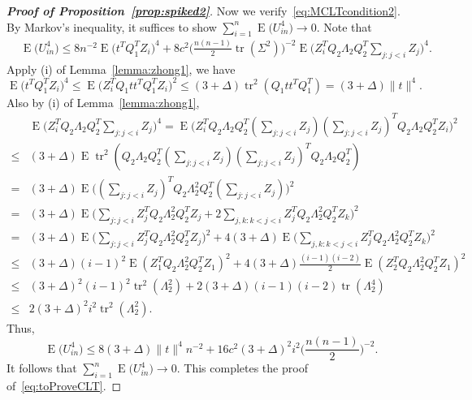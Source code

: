 \documentclass[3p]{elsarticle}
\DeclareMathOperator{\mytr}{tr}
\DeclareMathOperator{\myE}{E}
\theoremstyle{plain}
\theoremstyle{definition}
\theoremstyle{remark}
\begin{document}
\begin{proof}[\textbf{Proof of Proposition~\ref{prop:spiked2}}]
     Now we verify~\eqref{eq:MCLTcondition2}.
     By Markov's inequality, it suffices to show $\sum_{i=1}^n \myE\big(U_{in}^4\big)\to 0$.
     Note that
     $$
     \begin{aligned}
         &\myE\big(U_{in}^4\big)
         \leq
         8n^{-2}\myE \big(t^T Q_1^T Z_i\big)^4+
         8c^2  
         \big(\frac{n(n-1)}{2} \mytr(\Sigma^2)\big)^{-2}
         \myE\big( Z_i^T Q_2 \Lambda_2 Q_2^T \sum_{j:j<i}Z_j\big)^4.
     \end{aligned}
     $$
    Apply (i) of Lemma~\ref{lemma:zhong1}, we have
    $$
\myE \big(t^T Q_1^T Z_i\big)^4\leq
         \myE \big( Z_i^T Q_1 t t^T Q_1^T Z_i\big)^2
         \leq (3+\Delta)\mytr^2 (Q_1 t t^T Q_1^T)
         = (3+\Delta) \|t\|^4.
    $$
    Also by (i) of Lemma~\ref{lemma:zhong1},
    $$
    \begin{aligned}
        &
         \myE\big( Z_i^T Q_2 \Lambda_2 Q_2^T \sum_{j:j<i}Z_j\big)^4
         =
        \myE\big( Z_i^T Q_2 \Lambda_2 Q_2^T (\sum_{j:j<i}Z_j)(\sum_{j:j<i}Z_j)^T Q_2 \Lambda_2 Q_2^T Z_i\big)^2
        \\
        \leq &
        (3+\Delta)\myE \mytr^2 (Q_2 \Lambda_2 Q_2^T (\sum_{j:j<i}Z_j)(\sum_{j:j<i}Z_j)^T Q_2 \Lambda_2 Q_2^T)
        \\
        = &
        (3+\Delta)\myE  \Big((\sum_{j:j<i}Z_j)^T Q_2 \Lambda_2^2 Q_2^T (\sum_{j:j<i}Z_j)\Big)^2
        \\
        = &
        (3+\Delta)\myE  \Big(\sum_{j:j<i}Z_j^T Q_2 \Lambda_2^2 Q_2^T Z_j+2\sum_{j,k:k<j<i}Z_j^T Q_2 \Lambda_2^2 Q_2^T Z_k\Big)^2
        \\
        = &
        (3+\Delta)\myE  \Big(\sum_{j:j<i}Z_j^T Q_2 \Lambda_2^2 Q_2^T Z_j \Big)^2+4(3+\Delta)\myE \Big(\sum_{j,k:k<j<i}Z_j^T Q_2 \Lambda_2^2 Q_2^T Z_k\Big)^2
        \\
        \leq &
        (3+\Delta) (i-1)^2 \myE (Z_1^T Q_2 \Lambda_2^2 Q_2^T Z_1)^2 +4(3+\Delta)\frac{(i-1)(i-2)}{2} \myE (Z_2^T Q_2 \Lambda_2^2 Q_2^T Z_1)^2
        \\
        \leq &
        (3+\Delta)^2 (i-1)^2 \mytr^2 (\Lambda_2^2)  +2(3+\Delta)(i-1)(i-2)\mytr(\Lambda_2^4)
        \\
        \leq &
        2(3+\Delta)^2 i^2 \mytr^2 (\Lambda_2^2).
    \end{aligned}
    $$
    Thus,
     $$
         \myE\big(U_{in}^4\big)
         \leq 8 (3+\Delta)\|t\|^4 n^{-2}+
         16 c^2 (3+\Delta)^2 i^2 \big(\frac{n(n-1)}{2}\big)^{-2}.
     $$
     It follows that
     $
         \sum_{i=1}^n \myE\big(U_{in}^4\big)
        \to 0.
     $
     This completes the proof of~\eqref{eq:toProveCLT}.


\end{proof}
\end{document}
